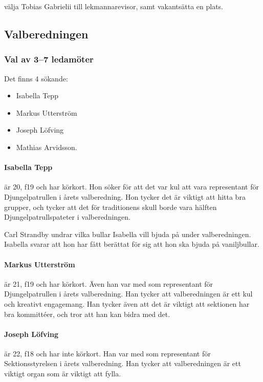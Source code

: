 \documentclass[hidelinks]{sektionsmote}
\begin{document}
\begin{beslut}
  \item välja Tobias Gabrielii till lekmannarevisor, samt vakantsätta en plats.
\end{beslut}

\subsection{Valberedningen}

\subsubsection{Val av 3--7 ledamöter}
Det finns 4 sökande:
\begin{itemize}
    \item Isabella Tepp
    \item Markus Utterström
    \item Joseph Löfving
    \item Mathias Arvidsson.
\end{itemize}

\paragraph{Isabella Tepp} är 20, f19 och har körkort.
Hon söker för att det var kul att vara representant för Djungelpatrullen i årets valberedning.
Hon tycker det är viktigt att hitta bra grupper, och tycker att det för traditionens skull borde vara hälften Djungelpatrullspateter i valberedningen.

Carl Strandby undrar vilka bullar Isabella vill bjuda på under valberedningen.
Isabella svarar att hon har fått berättat för sig att hon ska bjuda på vaniljbullar.

\paragraph{Markus Utterström} är 21, f19 och har körkort.
Även han var med som representant för Djungelpatrullen i årets valberedning.
Han tycker att valberedningen är ett kul och kreativt engagemang.
Han tycker även att det är viktigt att sektionen har bra kommittéer, och tror att han kan bidra med det.

\paragraph{Joseph Löfving} är 22, f18 och har inte körkort.
Han var med som representant för Sektionsstyrelsen i årets valberedning.
Han tycker att valberedningen är ett viktigt organ som är viktigt att fylla.
\end{document}
